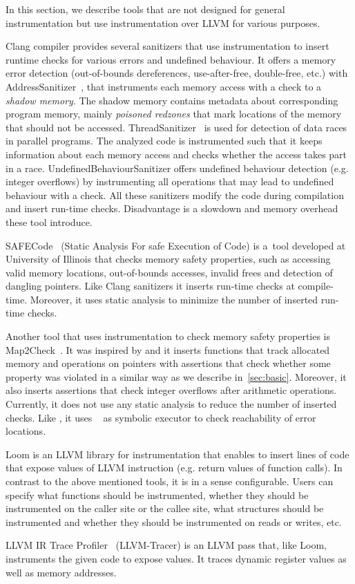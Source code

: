 In this section, we describe tools that are not designed for general
instrumentation but use instrumentation over LLVM for various purposes.

Clang compiler provides several sanitizers that use instrumentation to insert
runtime checks for various errors and undefined behaviour. It offers a memory
error detection (out-of-bounds dereferences, use-after-free, double-free, etc.)
with AddressSanitizer~\cite{asan}, that instruments each memory access with a
check to a \textit{shadow memory}. The shadow memory contains metadata about
corresponding program memory, mainly \textit{poisoned redzones} that mark
locations of the memory that should not be accessed.
ThreadSanitizer~\cite{tsan} is used for detection of data races in parallel
programs. The analyzed code is instrumented such that it keeps information
about each memory access and checks whether the access takes part in a race.
UndefinedBehaviourSanitizer offers undefined behaviour detection (e.g. integer
overflows) by instrumenting all operations that may lead to undefined behaviour
with a check. All these sanitizers modify the code during compilation and
insert run-time checks. Disadvantage is a slowdown and memory overhead these tool
introduce.

SAFECode~\cite{safecode} (Static Analysis For safe Execution of Code) is a~tool
developed at University of Illinois that checks memory safety properties, such
as accessing valid memory locations, out-of-bounds accesses, invalid frees and
detection of dangling pointers. Like Clang sanitizers it inserts run-time
checks at compile-time. Moreover, it uses static analysis to minimize the
number of inserted run-time checks.

Another tool that uses instrumentation to check memory safety properties is
Map2Check~\cite{map2check}. It was inspired by \symbiotic and it inserts
functions that track allocated memory and operations on pointers with
assertions that check whether some property was violated in a similar way as we
describe in~\ref{sec:basic}. Moreover, it also inserts assertions that check
integer overflows after arithmetic operations. Currently, it does not use any
static analysis to reduce the number of inserted checks. Like \symbiotic, it
uses \klee~\cite{klee} as symbolic executor to check reachability of error
locations.

Loom is an LLVM library for instrumentation that enables to insert lines of
code that expose values of LLVM instruction (e.g. return values of function
calls). In contrast to the above mentioned tools, it is in a sense
configurable. Users can specify what functions should be instrumented, whether
they should be instrumented on the caller site or the callee site, what
structures should be instrumented and whether they should be instrumented on
reads or writes, etc.

LLVM IR Trace Profiler~\cite{tracer} (LLVM-Tracer) is an LLVM pass that, like Loom,
instruments the given code to expose values. It traces dynamic register values
as well as memory addresses.
